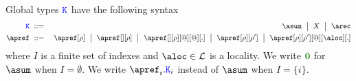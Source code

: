 Global types $\texttt{\textcolor{blue}K}$ have the following syntax
\begin{eqnarray*}
  \aK & \bnfdef & \asum \bnfmid
                  X \bnfmid
                  \arec
  \\
  \apref & \bnfdef & \apref[\arole] \bnfmid
                         \apref[{}][\arole] \bnfmid
                         \apref[{}][\arole][@][@][.] \bnfmid
                         \apref[\arole][\arole'] \bnfmid
                         \apref[\arole][\arole'][@][\aloc][.]
\end{eqnarray*}
where $I$ is a finite set of indexes and $\aloc \in \locset$ is a
locality. We write $\nil$ for $\asum$ when $I = \emptyset$. 
We write $\apref_i.\aK_i$ instead of $\asum$ when $I = \{i\}$.
 

